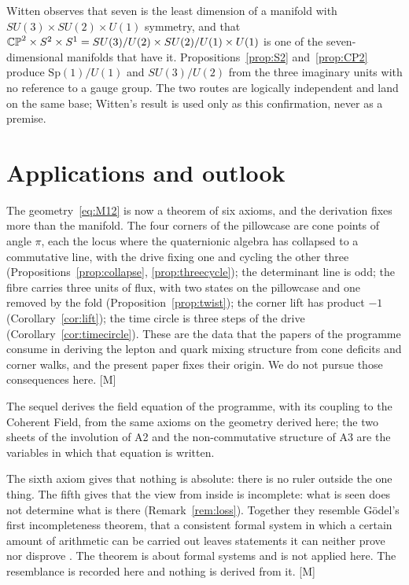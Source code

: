 \documentclass[11pt,a4paper]{article}
\theoremstyle{plain}
\theoremstyle{definition}
\theoremstyle{remark}
\newcommand{\rigM}{[\textup{M}]}
\begin{document}
Witten \cite{Witten1981} observes that seven is the least dimension of a manifold with $SU(3)\times SU(2)\times U(1)$ symmetry, and that $\mathbb{CP}^2\times S^2\times S^{1}=SU(3)/U(2)\times SU(2)/U(1)\times U(1)$ is one of the seven-dimensional manifolds that have it. Propositions~\ref{prop:S2} and~\ref{prop:CP2} produce $\mathrm{Sp}(1)/U(1)$ and $SU(3)/U(2)$ from the three imaginary units with no reference to a gauge group. The two routes are logically independent and land on the same base; Witten's result is used only as this confirmation, never as a premise.

\section{Applications and outlook}\label{sec:outlook}

The geometry~\eqref{eq:M12} is now a theorem of six axioms, and the derivation fixes more than the manifold. The four corners of the pillowcase are cone points of angle $\pi$, each the locus where the quaternionic algebra has collapsed to a commutative line, with the drive fixing one and cycling the other three (Propositions~\ref{prop:collapse}, \ref{prop:threecycle}); the determinant line is odd; the fibre carries three units of flux, with two states on the pillowcase and one removed by the fold (Proposition~\ref{prop:twist}); the corner lift has product $-1$ (Corollary~\ref{cor:lift}); the time circle is three steps of the drive (Corollary~\ref{cor:timecircle}). These are the data that the papers of the programme consume in deriving the lepton and quark mixing structure from cone deficits and corner walks, and the present paper fixes their origin. We do not pursue those consequences here. \rigM

The sequel derives the field equation of the programme, with its coupling to the Coherent Field, from the same axioms on the geometry derived here; the two sheets of the involution of A2 and the non-commutative structure of A3 are the variables in which that equation is written.

The sixth axiom gives that nothing is absolute: there is no ruler outside the one thing. The fifth gives that the view from inside is incomplete: what is seen does not determine what is there (Remark~\ref{rem:loss}). Together they resemble G\"odel's first incompleteness theorem, that a consistent formal system in which a certain amount of arithmetic can be carried out leaves statements it can neither prove nor disprove \cite{Godel1931}. The theorem is about formal systems and is not applied here. The resemblance is recorded here and nothing is derived from it. \rigM
\end{document}
